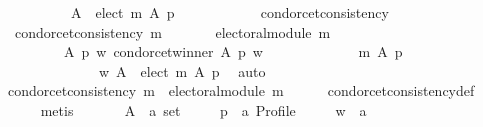 \begin{isabellebody}
\ \ \ \ \ \ \ \ \ \ A\ {\isacharminus}{\kern0pt}\ {\isacharparenleft}{\kern0pt}elect\ m\ A\ p{\isacharparenright}{\kern0pt}{\isacharcomma}{\kern0pt}\isanewline
\ \ \ \ \ \ \ \ \ \ {\isacharbraceleft}{\kern0pt}{\isacharbraceright}{\kern0pt}{\isacharparenright}{\kern0pt}{\isacharparenright}{\kern0pt}{\isacharparenright}{\kern0pt}{\isachardoublequoteclose}\isanewline
\isanewline
{}\isamarkupfalse%
\ condorcet{\isacharunderscore}{\kern0pt}consistency{}{\isacharcolon}{\kern0pt}\isanewline
\ \ {\isachardoublequoteopen}condorcet{\isacharunderscore}{\kern0pt}consistency\ m\ {\isasymlongleftrightarrow}\isanewline
\ \ \ \ \ \ electoral{\isacharunderscore}{\kern0pt}module\ m\ {\isasymand}\isanewline
\ \ \ \ \ \ \ \ {\isacharparenleft}{\kern0pt}{\isasymforall}\ A\ p\ w{\isachardot}{\kern0pt}\ condorcet{\isacharunderscore}{\kern0pt}winner\ A\ p\ w\ {\isasymlongrightarrow}\isanewline
\ \ \ \ \ \ \ \ \ \ \ \ {\isacharparenleft}{\kern0pt}m\ A\ p\ {\isacharequal}{\kern0pt}\isanewline
\ \ \ \ \ \ \ \ \ \ \ \ \ \ {\isacharparenleft}{\kern0pt}{\isacharbraceleft}{\kern0pt}w{\isacharbraceright}{\kern0pt}{\isacharcomma}{\kern0pt}\ A\ {\isacharminus}{\kern0pt}\ {\isacharparenleft}{\kern0pt}elect\ m\ A\ p{\isacharparenright}{\kern0pt}{\isacharcomma}{\kern0pt}\ {\isacharbraceleft}{\kern0pt}{\isacharbraceright}{\kern0pt}{\isacharparenright}{\kern0pt}{\isacharparenright}{\kern0pt}{\isacharparenright}{\kern0pt}{\isachardoublequoteclose}\isanewline
%
\isadelimproof
%
\endisadelimproof
%
\isatagproof
{}\isamarkupfalse%
\ {\isacharparenleft}{\kern0pt}auto{\isacharparenright}{\kern0pt}\isanewline
\ \ \isamarkupfalse%
\ {\isachardoublequoteopen}condorcet{\isacharunderscore}{\kern0pt}consistency\ m\ {\isasymLongrightarrow}\ electoral{\isacharunderscore}{\kern0pt}module\ m{\isachardoublequoteclose}\isanewline
\ \ \ \ \isamarkupfalse%
\ condorcet{\isacharunderscore}{\kern0pt}consistency{\isacharunderscore}{\kern0pt}def\isanewline
\ \ \ \ \isamarkupfalse%
\ metis\isanewline
{}\isamarkupfalse%
\isanewline
\ \ \isamarkupfalse%
\isanewline
\ \ \ \ A\ {\isacharcolon}{\kern0pt}{\isacharcolon}{\kern0pt}\ {\isachardoublequoteopen}{\isacharprime}{\kern0pt}a\ set{\isachardoublequoteclose}\ \isanewline
\ \ \ \ p\ {\isacharcolon}{\kern0pt}{\isacharcolon}{\kern0pt}\ {\isachardoublequoteopen}{\isacharprime}{\kern0pt}a\ Profile{\isachardoublequoteclose}\ \isanewline
\ \ \ \ w\ {\isacharcolon}{\kern0pt}{\isacharcolon}{\kern0pt}\ {\isachardoublequoteopen}{\isacharprime}{\kern0pt}a{\isachardoublequoteclose}\isanewline

\end{isabellebody}
